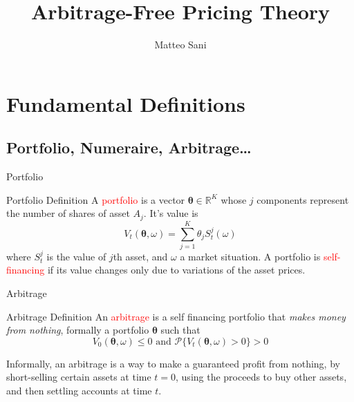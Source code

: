 \documentclass{beamer}
\title{Arbitrage-Free Pricing Theory}
\author{Matteo Sani}
\begin{document}
	\begin{frame}[plain]
		\maketitle
	\end{frame}

\section{Fundamental Definitions}
\subsection{Portfolio, Numeraire, Arbitrage\ldots}
\begin{frame}{Portfolio}
	\begin{block}{Portfolio Definition}
		A \textcolor{red}{portfolio} is a vector $\mathbf{\theta}\in \mathbb{R}^K$ whose $j$ components represent the number of shares of asset $A_j$. It's value is
		\begin{equation}
			V_t(\mathbf{\theta}, \omega)=\sum_{j=1}^K\theta_jS^j_t(\omega)
		\end{equation} 
		where $S_t^j$ is the value of $j$th asset, and $\omega$ a market situation. A portfolio is \textcolor{red}{self-financing} if its value changes only due to variations of the asset prices.
	\end{block}
\end{frame}

\begin{frame}{Arbitrage}
	\begin{block}{Arbitrage Definition}
		An \textcolor{red}{arbitrage} is a self financing portfolio that \emph{makes money from nothing}, formally a portfolio $\mathbf{\theta}$ such that
		\begin{equation}
				V_0(\mathbf{\theta}, \omega)\le 0 \text{ and } \mathcal{P}\{V_t(\mathbf{\theta}, \omega) > 0\} > 0
		\end{equation}
	\end{block}
	Informally, an arbitrage is a way to make a guaranteed profit from nothing, by short-selling certain assets at time $t = 0$, using the proceeds to buy other assets, and then settling accounts at time $t$.
\end{frame}
\end{document}

